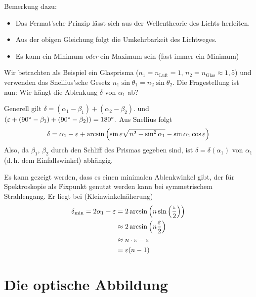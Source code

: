 Bemerkung dazu:
\begin{itemize}
\item Das Fermat'sche Prinzip lässt sich aus der Wellentheorie des
  Lichts herleiten.
\item Aus der obigen Gleichung folgt die Umkehrbarkeit des Lichtweges.
\item Es kann ein Minimum \emph{oder} ein Maximum sein (fast immer ein
  Minimum)
\end{itemize}


Wir betrachten als Beispiel ein Glasprisma ($n_1=n_\text{Luft}=1$,
$n_2=n_\text{Glas}\approx 1,5$) und verwenden das Snellius'sche Gesetz
$n_1\sin\theta_1 = n_2\sin\theta_2$.
Die Fragestellung ist nun: Wie hängt die Ablenkung $\delta$ von
$\alpha_1$ ab?

Generell gilt $\delta = (\alpha_1-\beta_1)+(\alpha_2-\beta_2)$.
und $(\varepsilon+(\ang{90}-\beta_1)+(\ang{90}-\beta_2))=\ang{180}$.
Aus Snellius folgt
\begin{gather*}
  \delta = \alpha_1 - \varepsilon
  + \arcsin\left(
    \sin\varepsilon\sqrt{n^2-\sin^2\alpha_1}-\sin\alpha_1\cos\varepsilon
  \right)
\end{gather*}
Also, da $\beta_1$, $\beta_2$ durch den Schliff des Prismas gegeben
sind, ist $\delta=\delta(\alpha_1)$ von $\alpha_1$ (d.\,h. dem
Einfallswinkel) abhängig.

Es kann gezeigt werden, dass es einen minimalen Ablenkwinkel gibt, der
für Spektroskopie als Fixpunkt genutzt werden kann bei symmetrischem
Strahlengang. Er liegt bei (Kleinwinkelnäherung)
\begin{align*}
  \delta_\text{min} 
  = 2\alpha_1-\varepsilon 
  &= 2\arcsin\left(n\sin\left(\frac{\varepsilon}{2}\right)\right)\\
  &\approx 2\arcsin\left(n\frac{\varepsilon}{2}\right)\\
  &\approx n\cdot\varepsilon - \varepsilon \\
  &= \varepsilon(n-1)
\end{align*}



\section{Die optische Abbildung}
